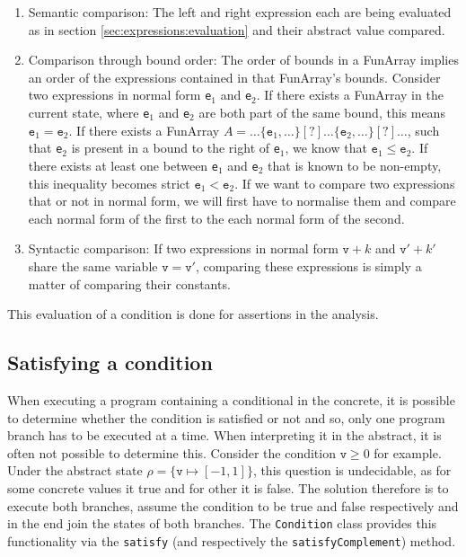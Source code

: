 \begin{enumerate}
	\item Semantic comparison: The left and right expression each are being evaluated as in section \ref{sec:expressions:evaluation} and their abstract value compared. 
	\item Comparison through bound order: The order of bounds in a FunArray implies an order of the expressions contained in that FunArray's bounds. Consider two expressions in normal form \texttt{e}$_1$ and \texttt{e}$_2$. If there exists a FunArray in the current state, where \texttt{e}$_1$ and \texttt{e}$_2$ are both part of the same bound, this means $\mathtt{e}_1=\mathtt{e}_2$. If there exists a FunArray $A=\ldots\{\mathtt{e}_1,\ldots\}[?]\ldots\{\mathtt{e}_2,\ldots\}[?]\ldots $, such that \texttt{e}$_2$ is present in a bound to the right of \texttt{e}$_1$, we know that $\mathtt{e}_1\leq\mathtt{e}_2$. If there exists at least one between \texttt{e}$_1$ and \texttt{e}$_2$ that is known to be non-empty, this inequality becomes strict $\mathtt{e}_1<\mathtt{e}_2$. If we want to compare two expressions that or not in normal form, we will first have to normalise them and compare each normal form of the first to the each normal form of the second.
	\item Syntactic comparison: If two expressions in normal form $\mathtt{v}+k$ and $\mathtt{v}'+k'$ share the same variable $\mathtt{v}=\mathtt{v}'$, comparing these expressions is simply a matter of comparing their constants.
\end{enumerate}

\noindent This evaluation of a condition is done for assertions in the analysis. 

\subsection{Satisfying a condition}
When executing a program containing a conditional in the concrete, it is possible to determine whether the condition is satisfied or not and so, only one program branch has to be executed at a time. When interpreting it in the abstract, it is often not possible to determine this. Consider the condition $\mathtt{v}\geq0$ for example. Under the abstract state $\rho=\{\mathtt{v}\mapsto[-1,1]\}$, this question is undecidable, as for some concrete values it true and for other it is false. The solution therefore is to execute both branches, assume the condition to be true and false respectively and in the end join the states of both branches. The \texttt{Condition} class provides this functionality via the \texttt{satisfy} (and respectively the \texttt{satisfyComplement}) method. 


